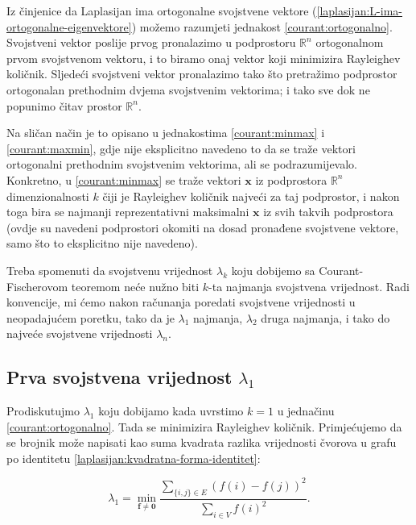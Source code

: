 Iz činjenice da Laplasijan ima ortogonalne svojstvene vektore (\ref{laplasijan:L-ima-ortogonalne-eigenvektore}) možemo razumjeti jednakost \ref{courant:ortogonalno}. Svojstveni vektor poslije prvog pronalazimo u podprostoru \(\mathbb{R}^{n}\) ortogonalnom prvom svojstvenom vektoru, i to biramo onaj vektor koji minimizira Rayleighev količnik. Sljedeći svojstveni vektor pronalazimo tako što pretražimo podprostor ortogonalan prethodnim dvjema svojstvenim vektorima; i tako sve dok ne popunimo čitav prostor \(\mathbb{R}^{n}\). 

Na sličan način je to opisano u jednakostima \ref{courant:minmax} i \ref{courant:maxmin}, gdje nije eksplicitno navedeno to da se traže vektori ortogonalni prethodnim svojstvenim vektorima, ali se podrazumijevalo. Konkretno, u \ref{courant:minmax} se traže vektori \(\mathbf{x}\) iz podprostora \(\mathbb{R}^n\) dimenzionalnosti \(k\) čiji je Rayleighev količnik najveći za taj podprostor, i nakon toga bira se najmanji reprezentativni maksimalni \(\mathbf{x}\) iz svih takvih podprostora (ovdje su navedeni podprostori okomiti na dosad pronađene svojstvene vektore, samo što to eksplicitno nije navedeno).

Treba spomenuti da svojstvenu vrijednost \(\lambda_k\) koju dobijemo sa Courant-Fischerovom teoremom neće nužno biti \(k\)-ta najmanja svojstvena vrijednost. Radi konvencije, mi ćemo nakon računanja poredati svojstvene vrijednosti u neopadajućem poretku, tako da je \(\lambda_1\) najmanja, \(\lambda_2\) druga najmanja, i tako do najveće svojstvene vrijednosti \(\lambda_n\).

\subsection{Prva svojstvena vrijednost \(\lambda_1\)}

Prodiskutujmo \(\lambda_1\) koju dobijamo kada uvrstimo \(k=1\) u jednačinu \ref{courant:ortogonalno}. Tada se minimizira Rayleighev količnik. Primjećujemo da se brojnik može napisati kao suma kvadrata razlika vrijednosti čvorova u grafu po identitetu \ref{laplasijan:kvadratna-forma-identitet}:

\begin{equation}
       \lambda_1
       =
       \min_{\mathbf{f}\neq\mathbf{0}}
       \frac{\sum_{\{i,j\}\in E}(f(i)-f(j))^2}{\sum_{i\in V} f(i)^2}.
   \end{equation}

